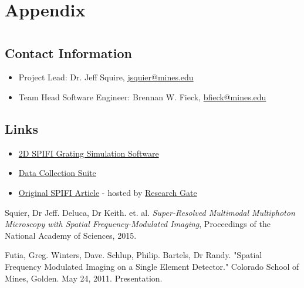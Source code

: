 \documentclass[12pt]{article}
\begin{document}
\newpage
\section*{Appendix}
\appendix

\section{\label{app:misc}}
\subsection{Contact Information}
\begin{itemize}
\item Project Lead: Dr. Jeff Squire, \href{mailto:jsquier@mines.edu}{jsquier@mines.edu}
\item Team Head Software Engineer: Brennan W. Fieck, \href{mailto:bfieck@mymail.mines.edu}{bfieck@mines.edu}
\end{itemize}
\subsection{Links}
\begin{itemize}
\item \href{https://gitlab.com/PiercingGaze/2DSimulator}{2D SPIFI Grating Simulation Software}
\item \href{https://gitlab.com/PiercingGaze/SPIFIDataCollectionSoftware}{Data Collection Suite}
\item \href{https://www.researchgate.net/profile/Alyssa_Allende_Motz/publication/281058706_Super-resolved_multimodal_multiphoton_microscopy_with_spatial_frequency-modulated_imaging/links/5790535d08ae64311c0c7dbb.pdf?origin=publication_detail&ev=pub_int_prw_xdl&msrp=c3fj9RD45iTpvk8bRBlzYkN6ndcAYlW9SDWsP0gVb8WzFV5pplCJ3WT6D9fQrP2OT3rGfRWxpWECBz07rTxtH3ZWQ-V2CIIn99KlfPF-otY.9HgCklW2b18-KeSg_Y6vX11zOug1uQ3SSCEpbGXSzk5y_fIuZAdBHJtjk82L1NpfpV2e2Cvcd6QBkqBT24bFzQ.uEqPWNYXdN8Ge_jgkDmRdTlNB8rMwiFPPFdueuZQ9VY6c_KOsp-YvgMVBaNkL6Ldag5ifDVuL2YqcNGnICTcHA}{Original SPIFI Article} - hosted by
\href{https://www.researchgate.net}{Research Gate}
\end{itemize}
\newpage
\begin{thebibliography}{9}

  Squier, Dr Jeff. Deluca, Dr Keith. et. al.
  \emph{Super-Resolved Multimodal Multiphoton Microscopy with Spatial Frequency-Modulated
Imaging},
  Proceedings of the National Academy of Sciences,
  2015.
  
  Futia, Greg. Winters, Dave. Schlup, Philip. Bartels, Dr Randy.
  "Spatial Frequency Modulated Imaging on a Single Element Detector."
  Colorado School of Mines, Golden. May 24, 2011. Presentation.
  

\end{thebibliography}
\end{document}
